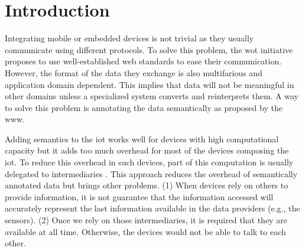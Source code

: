 \section{Introduction}
\label{sec:search_intro}

% 

Integrating mobile or embedded devices is not trivial as they usually communicate using different protocols.
To solve this problem, the \acl{wot} initiative proposes to use well-established web standards to ease their communication.
However, the format of the data they exchange is also multifarious and application domain dependent.
This implies that data will not be meaningful in other domains unless a specialized system converts and reinterprets them.
A way to solve this problem is annotating the data semantically as proposed by the \ac{www}.

Adding semantics to the \ac{iot} works well for devices with high computational capacity but it adds too much overhead for most of the devices composing the \ac{iot}.
To reduce this overhead in such devices, part of this computation is usually delegated to intermediaries \citep{honkola_smart-m3_2010}.
This approach reduces the overhead of semantically annotated data but brings other problems.
(1) When devices rely on others to provide information, it is not guarantee that the information accessed will accurately represent the last information available in the data providers (e.g., the sensors).
(2) Once we rely on those intermediaries, it is required that they are available at all time.
Otherwise, the devices would not be able to talk to each other.

